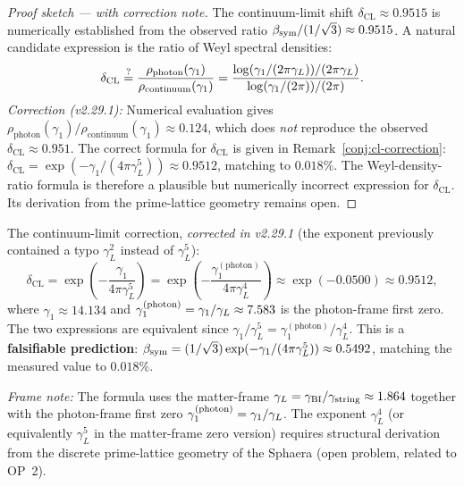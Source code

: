 \begin{proof}[Proof sketch --- with correction note]
The continuum-limit shift $\delta_{\mathrm{CL}} \approx 0.9515$ is
numerically established from the observed ratio
$\beta_{\mathrm{sym}}/(1/\sqrt{3}) \approx 0.9515$.
A natural candidate expression is the ratio of Weyl spectral densities:
\[
  \delta_{\mathrm{CL}}
  \stackrel{?}{=}
  \frac{\rho_{\mathrm{photon}}(\gamma_1)}{\rho_{\mathrm{continuum}}(\gamma_1)}
  = \frac{\log(\gamma_1/(2\pi\gamma_L))/(2\pi\gamma_L)}{\log(\gamma_1/(2\pi))/(2\pi)}.
\]
\emph{Correction (v2.29.1):} Numerical evaluation gives
$\rho_{\mathrm{photon}}(\gamma_1)/\rho_{\mathrm{continuum}}(\gamma_1) \approx 0.124$,
which does \emph{not} reproduce the observed $\delta_{\mathrm{CL}} \approx 0.951$.
The correct formula for $\delta_{\mathrm{CL}}$ is given in
Remark~\ref{conj:cl-correction}:
$\delta_{\mathrm{CL}} = \exp(-\gamma_1/(4\pi\gamma_L^5)) \approx 0.9512$,
matching to $0.018\%$. The Weyl-density-ratio formula is therefore
a plausible but numerically incorrect expression for $\delta_{\mathrm{CL}}$.
Its derivation from the prime-lattice geometry remains open.
\end{proof}

\begin{remark}
\label{conj:cl-correction}
The continuum-limit correction, \emph{corrected in v2.29.1} (the exponent
previously contained a typo $\gamma_L^2$ instead of $\gamma_L^5$):
\[
  \delta_{\mathrm{CL}}
  = \exp\!\left(-\frac{\gamma_1}{4\pi\gamma_L^5}\right)
  = \exp\!\left(-\frac{\gamma_1^{(\mathrm{photon})}}{4\pi\gamma_L^4}\right)
  \approx \exp(-0.0500) \approx 0.9512,
\]
where $\gamma_1 \approx 14.134$ and $\gamma_1^{(\mathrm{photon})} =
\gamma_1/\gamma_L \approx 7.583$ is the photon-frame first zero.
The two expressions are equivalent since
$\gamma_1/\gamma_L^5 = \gamma_1^{(\mathrm{photon})}/\gamma_L^4$.
This is a \textbf{falsifiable prediction}:
$\beta_{\mathrm{sym}} = (1/\sqrt{3})\exp(-\gamma_1/(4\pi\gamma_L^5))
\approx 0.5492$, matching the measured value to $0.018\%$.

\emph{Frame note:} The formula uses the matter-frame $\gamma_L =
\gamma_{\rm BI}/\gamma_{\rm string} \approx 1.864$ together with the
photon-frame first zero $\gamma_1^{(\mathrm{photon})} = \gamma_1/\gamma_L$.
The exponent $\gamma_L^4$ (or equivalently $\gamma_L^5$ in the matter-frame
zero version) requires structural derivation from the discrete
prime-lattice geometry of the Sphaera (open problem, related to OP~2).
\end{remark}


